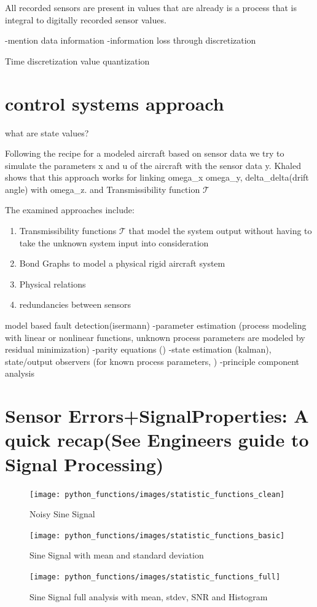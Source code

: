 All recorded sensors are present in values that are already is a process that is integral to digitally recorded sensor values.



-mention data information
-information loss through discretization

Time discretization
value quantization


\section{control systems approach}

what are state values?


Following the recipe for a modeled aircraft based on sensor data we try to simulate the parameters x and u of the aircraft with the sensor data y. Khaled shows that this approach works for linking omega_x omega_y, delta_delta(drift angle) with omega_z. and Transmissibility function  $\mathcal{T}$


The examined approaches include:
\begin{enumerate}
    \item Transmissibility functions $\mathcal{T}$ that model the system output without having to take the unknown
    system input into consideration
    \item Bond Graphs to model a physical rigid aircraft system
    \item Physical relations
    \item redundancies between sensors
\end{enumerate}

model based fault detection(isermann)
-parameter estimation (process modeling with linear or nonlinear functions, unknown process parameters are modeled by residual minimization)
-parity equations ()
-state estimation (kalman), state/output observers (for known process parameters, )
-principle component analysis


\section{Sensor Errors+SignalProperties: A quick recap(See Engineers guide to Signal Processing)}

\begin{figure}[h]
    \centering
    \texttt{[image: python\_functions/images/statistic\_functions\_clean]}
    \caption{Noisy Sine Signal}
    \label{fig:statistics_clean}
\end{figure}
\begin{figure}[h]
    \centering
    \texttt{[image: python\_functions/images/statistic\_functions\_basic]}
    \caption{Sine Signal with mean and standard deviation}
    \label{fig:statistics_basic}
\end{figure}
\begin{figure}[h]
    \centering
    \texttt{[image: python\_functions/images/statistic\_functions\_full]}
    \caption{Sine Signal full analysis with mean, stdev, SNR and Histogram}
    \label{fig:statistics_full}
\end{figure}


